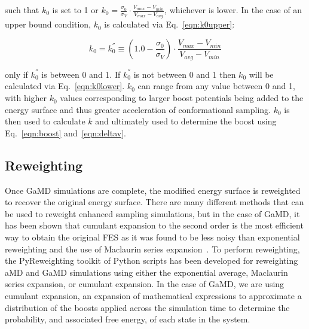 \documentclass[9pt,tutorial]{livecoms}
\begin{document}
such that $k_{0}$ is set to 1 or $k_{0} = \frac{\sigma_{0}}{\sigma_{V}} \cdot \frac{V_{max} - {V_{min}}}{V_{max} - V_{avg}}$, whichever is lower. In the case of an upper bound condition, $k_{0}$ is calculated via Eq.~\ref{eqn:k0upper}:

\begin{equation}
    k_{0} = k_{0}^{''} \equiv \left (1.0 - \frac{\sigma_{0}}{\sigma_{V}} \right) \cdot \frac{V_{max} - {V_{min}}}{V_{avg} - V_{min}}
    \label{eqn:k0upper}
\end{equation}

only if $k_{0}^{''}$ is between 0 and 1. If $k_{0}^{''}$ is not between 0 and 1 then $k_{0}$ will be calculated via Eq.~\ref{eqn:k0lower}. $k_{0}$ can range from any value between 0 and 1, with higher $k_{0}$ values corresponding to larger boost potentials being added to the energy surface and thus greater acceleration of conformational sampling. $k_{0}$ is then used to calculate $k$ and ultimately used to determine the boost using Eq.~\ref{eqn:boost} and~\ref{eqn:deltav}.

\bigskip
\subsection{Reweighting}
\label{ss:reweighting}
Once GaMD simulations are complete, the modified energy surface is reweighted to recover the original energy surface. There are many different methods that can be used to reweight enhanced sampling simulations, but in the case of GaMD, it has been shown that cumulant expansion to the second order is the most efficient way to obtain the original FES as it was found to be less noisy than exponential reweighting and the use of Maclaurin series expansion~\cite{miao_improved_2014}. To perform reweighting, the PyReweighting toolkit of Python scripts has been developed for reweighting aMD and GaMD simulations using either the exponential average, Maclaurin series expansion, or cumulant expansion. In the case of GaMD, we are using cumulant expansion, an expansion of mathematical expressions to approximate a distribution of the boosts applied across the simulation time to determine the probability, and associated free energy, of each state in the system. 
\end{document}
